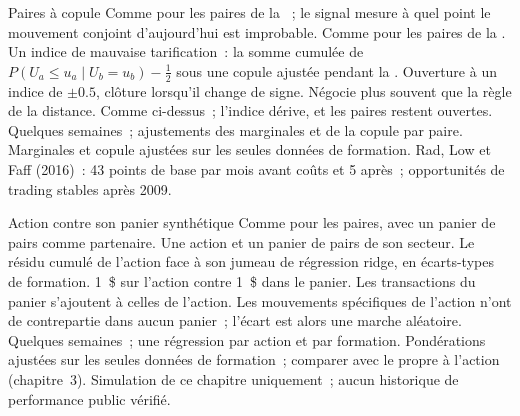\begin{strategyfile}{Paires à copule}\label{strat:s1:pairs-and-baskets:copula}
 Comme pour les paires de la ~; le signal mesure à quel point le mouvement conjoint d'aujourd'hui est improbable.
 Comme pour les paires de la .
 Un indice de mauvaise tarification~: la somme cumulée de $P(U_a \le u_a \mid U_b = u_b) - \tfrac12$ sous une copule ajustée pendant la .
 Ouverture à un indice de $\pm 0.5$, clôture lorsqu'il change de signe.
 Négocie plus souvent que la règle de la distance.
 Comme ci-dessus~; l'indice dérive, et les paires restent ouvertes.
 Quelques semaines~; ajustements des marginales et de la copule par paire.
 Marginales et copule ajustées sur les seules données de formation.
 Rad, Low et Faff (2016)~: 43 points de base par mois avant coûts et 5 après~; opportunités de trading stables après 2009.
\end{strategyfile}

\begin{strategyfile}{Action contre son panier synthétique}\label{strat:s1:pairs-and-baskets:basket}
 Comme pour les paires, avec un panier de pairs comme partenaire.
 Une action et un panier de pairs de son secteur.
 Le résidu cumulé de l'action face à son jumeau de régression ridge, en écarts-types de formation.
 1~\$ sur l'action contre 1~\$ dans le panier.
 Les transactions du panier s'ajoutent à celles de l'action.
 Les mouvements spécifiques de l'action n'ont de contrepartie dans aucun panier~; l'écart est alors une marche aléatoire.
 Quelques semaines~; une régression par action et par formation.
 Pondérations ajustées sur les seules données de formation~; comparer avec le  propre à l'action (chapitre~3).
 Simulation de ce chapitre uniquement~; aucun historique de performance public vérifié.
\end{strategyfile}

